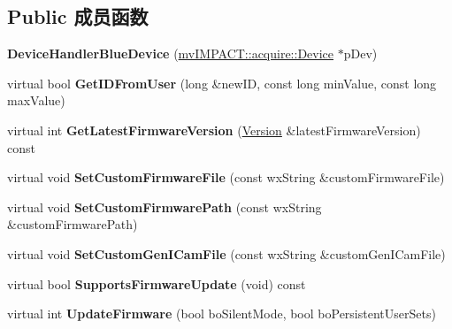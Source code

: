 \subsection*{Public 成员函数}
\begin{DoxyCompactItemize}
\item 
\hypertarget{class_device_handler_blue_device_ac216ff2a97a882da06c0486262585b7f}{{\bfseries Device\+Handler\+Blue\+Device} (\hyperlink{classmv_i_m_p_a_c_t_1_1acquire_1_1_device}{mv\+I\+M\+P\+A\+C\+T\+::acquire\+::\+Device} $\ast$p\+Dev)}\label{class_device_handler_blue_device_ac216ff2a97a882da06c0486262585b7f}

\item 
\hypertarget{class_device_handler_blue_device_a3df3df1b9d7730983c08cd9298ae7bc0}{virtual bool {\bfseries Get\+I\+D\+From\+User} (long \&new\+I\+D, const long min\+Value, const long max\+Value)}\label{class_device_handler_blue_device_a3df3df1b9d7730983c08cd9298ae7bc0}

\item 
\hypertarget{class_device_handler_blue_device_aa7750b607b98cf84bc56d39d179d797a}{virtual int {\bfseries Get\+Latest\+Firmware\+Version} (\hyperlink{struct_version}{Version} \&latest\+Firmware\+Version) const }\label{class_device_handler_blue_device_aa7750b607b98cf84bc56d39d179d797a}

\item 
\hypertarget{class_device_handler_blue_device_a04f9d0657d1ab0674daf6abb60045be2}{virtual void {\bfseries Set\+Custom\+Firmware\+File} (const wx\+String \&custom\+Firmware\+File)}\label{class_device_handler_blue_device_a04f9d0657d1ab0674daf6abb60045be2}

\item 
\hypertarget{class_device_handler_blue_device_af2a9487d65bb55fe45b3e700d3b835b0}{virtual void {\bfseries Set\+Custom\+Firmware\+Path} (const wx\+String \&custom\+Firmware\+Path)}\label{class_device_handler_blue_device_af2a9487d65bb55fe45b3e700d3b835b0}

\item 
\hypertarget{class_device_handler_blue_device_a12be635cb0526f20afd95532011ee17a}{virtual void {\bfseries Set\+Custom\+Gen\+I\+Cam\+File} (const wx\+String \&custom\+Gen\+I\+Cam\+File)}\label{class_device_handler_blue_device_a12be635cb0526f20afd95532011ee17a}

\item 
\hypertarget{class_device_handler_blue_device_a8b350996a007d2257791db96d14f360b}{virtual bool {\bfseries Supports\+Firmware\+Update} (void) const }\label{class_device_handler_blue_device_a8b350996a007d2257791db96d14f360b}

\item 
\hypertarget{class_device_handler_blue_device_ac52c82b573f5f94cd2fbc25793139a21}{virtual int {\bfseries Update\+Firmware} (bool bo\+Silent\+Mode, bool bo\+Persistent\+User\+Sets)}\label{class_device_handler_blue_device_ac52c82b573f5f94cd2fbc25793139a21}

\end{DoxyCompactItemize}
